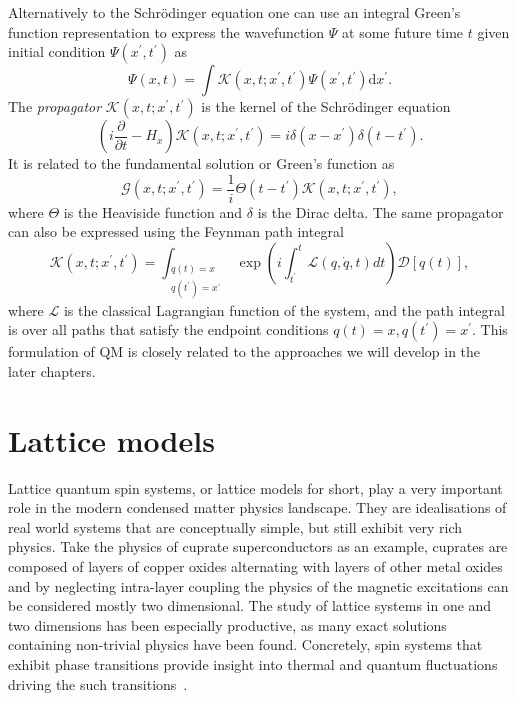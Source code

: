 Alternatively to the Schr\" odinger equation one can use an integral Green's function representation to express the wavefunction $\Psi$ at some future time $t$ given initial condition $\Psi(x^\prime, t^\prime)$ as
\begin{equation}
\Psi\left(x, t\right)=\int  \mathcal{K}\left(x, t ; x^\prime, t^\prime\right) \Psi\left(x^\prime, t^\prime\right) \mathrm{d} x^\prime.
\end{equation}
The \emph{propagator} $\mathcal{K}\left(x, t ; x^\prime, t^\prime\right)$ is the kernel of the Schr\" odinger equation
\begin{equation}
\left(i \frac{\partial}{\partial t}-H_{x}\right) \mathcal{K}\left(x, t ; x^\prime, t^\prime\right)=i \delta\left(x - x^\prime\right) \delta\left(t-t^\prime\right).
\end{equation}
It is related to the fundamental solution or Green's function as
\begin{equation}
\mathcal G\left(x, t ; x^{\prime}, t^{\prime}\right)=\frac{1}{i} \Theta\left(t-t^{\prime}\right) \mathcal K\left(x, t ; x^{\prime}, t^{\prime}\right),
\end{equation}
where $\Theta$ is the Heaviside function and $\delta$ is the Dirac delta. The same propagator can also be expressed using the Feynman path integral
\begin{equation}
\label{eq:FPI}
\mathcal{K}\left(x, t ; x^\prime, t^\prime\right)=\int_{\substack{q(t)=x \\ q(t^\prime)=x^\prime}} \exp \left(i \int_{t^\prime}^{t} \mathcal{L}(q, \dot{q}, t) d t\right)\mathcal{D}[q(t)],
\end{equation}
where $\mathcal{L}$ is the classical Lagrangian function of the system, and the path integral is over all paths that satisfy the endpoint conditions $q(t)=x, q(t^\prime)=x^\prime$. This formulation of QM is closely related to the approaches we will develop in the later chapters. 

\section{Lattice models}
\label{sec:lattice-models}
Lattice quantum spin systems, or lattice models for short, play a very important role in the modern condensed matter physics landscape. They are idealisations of real world systems that are conceptually simple, but still exhibit very rich physics. Take the physics of cuprate superconductors as an example, cuprates are composed of layers of copper oxides alternating with layers of other metal oxides and by neglecting intra-layer coupling the physics of the magnetic excitations can be considered mostly two dimensional. The study of lattice systems in one and two dimensions has been especially productive, 
as many exact solutions containing non-trivial physics have been found. Concretely, spin systems that exhibit phase transitions provide insight into thermal and quantum fluctuations driving the such transitions~\cite{parkinson2010introduction}.

